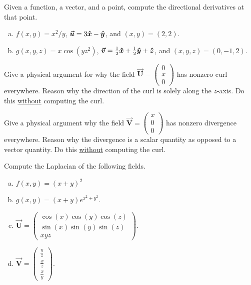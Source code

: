 \documentclass[12pt]{article} %
\newcommand{\vecfieldV}{\boldsymbol{\vec{V}}}
\newcommand{\vecfieldU}{\boldsymbol{\vec{U}}}
\begin{document}
\begin{problem}
Given a function, a vector, and a point, compute the directional derivatives at that point.
\begin{enumerate}[(a)]
    \item $f(x,y)=x^2/y$, $\boldsymbol{\boldsymbol{\vec{u}}} = 3\boldsymbol{\hat{x}} -\boldsymbol{\hat{y}}$, and $(x,y)=(2,2)$.
    \item $g(x,y,z)=x\cos(yz^2)$, $\boldsymbol{\boldsymbol{\vec{v}}} = \frac{1}{2}\boldsymbol{\hat{x}} + \frac{1}{2} \boldsymbol{\hat{y}} + \boldsymbol{\hat{z}}$, and $(x,y,z)=(0,-1,2)$.
\end{enumerate}
\end{problem}

\begin{problem}
    Give a physical argument for why the field $\vecfieldU = \begin{pmatrix} 0 \\ x \\ 0 \end{pmatrix}$ has nonzero curl everywhere. Reason why the direction of the curl is solely along the $z$-axis.  Do this \underline{without} computing the curl.
\end{problem}

\begin{problem}
    Give a physical argument why the field $\vecfieldV = \begin{pmatrix} x \\ 0 \\ 0 \end{pmatrix}$ has nonzero divergence everywhere. Reason why the divergence is a scalar quantity as opposed to a vector quantity. Do this \underline{without} computing the curl.
\end{problem}

\begin{problem}
Compute the Laplacian of the following fields.
\begin{multicols}{2}
\begin{enumerate}[(a)]
    \item $f(x,y) = (x+y)^2$
    \item $g(x,y) = (x+y)e^{x^2+y^2}$.
    \item $\vecfieldU = \begin{pmatrix} \cos(x)\cos(y)\cos(z) \\ \sin(x)\sin(y)\sin(z) \\ xyz \end{pmatrix}$.
    \item $\vecfieldV = \begin{pmatrix} \frac{y}{z} \\ \frac{x}{z} \\ \frac{x}{y} \end{pmatrix}$.
\end{enumerate}
\end{multicols}
\end{problem}
\end{document}

